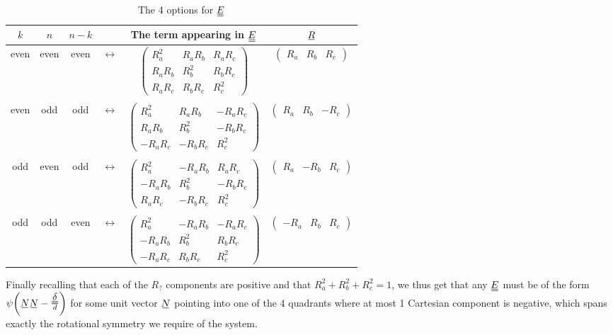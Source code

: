 \documentclass[11pt]{article}
\newcommand\barbelow[1]{\stackunder[1.2pt]{$#1$}{\rule{1.5ex}{.1ex}}}
\newcommand{\su}[1]{\barbelow{#1}}
\newcommand{\du}[1]{\barbelow{\barbelow{#1}}}
\begin{document}
\begin{table}[H]
    \begin{center}
        \begin{tabular}{ c|c|c c c c } 
            $k$ & $n$ & $n-k$ & & The term appearing in $\du{E}$ & $\su{R}$ \\
             \hline
             even & even & even & $\leftrightarrow$ & $\begin{pmatrix}R_a^2 & R_a R_b & R_a R_c \\ R_a R_b & R_b^2 & R_b R_c \\ R_a R_c & R_b R_c & R_c^2 \end{pmatrix}$ & $\begin{pmatrix}R_a & R_b & R_c\end{pmatrix}$ \\
            &&&&\\
             even & odd & odd & $\leftrightarrow$ & $\begin{pmatrix}
                R_a^2 & R_a R_b & -R_a R_c \\
                R_a R_b & R_b^2 & -R_b R_c \\
                -R_a R_c & -R_b R_c & R_c^2
                 \end{pmatrix}$ & $\begin{pmatrix}R_a & R_b & -R_c\end{pmatrix}$ \\
            &&&&\\
             odd & even & odd & $\leftrightarrow$ & $\begin{pmatrix}
                R_a^2 & -R_a R_b & R_a R_c \\
                -R_a R_b & R_b^2 & -R_b R_c \\
                R_a R_c & -R_b R_c & R_c^2
                 \end{pmatrix}$ & $\begin{pmatrix}R_a & -R_b & R_c\end{pmatrix}$ \\
            &&&&\\
             odd & odd & even & $\leftrightarrow$ & $\begin{pmatrix}
                R_a^2 & -R_a R_b & -R_a R_c \\
                -R_a R_b & R_b^2 & R_b R_c \\
                -R_a R_c & R_b R_c & R_c^2
                 \end{pmatrix}$ & $\begin{pmatrix}-R_a & R_b & R_c\end{pmatrix}$
        \end{tabular}
    \end{center}
    \caption{The 4 options for $\du{E}$}
\end{table}
Finally recalling that each of the $R_?$ components are positive and that $R_a^2 + R_b^2 + R_c^2 = 1$, we thus get that any $\du{E}$ must be of the form $\psi\qty(\su{N}\su{N} - \frac{\du{\delta}}{d})$ for some unit vector $\su{N}$ pointing into one of the 4 quadrants where at most 1 Cartesian component is negative, which spans exactly the rotational symmetry we require of the system.
\end{document}
